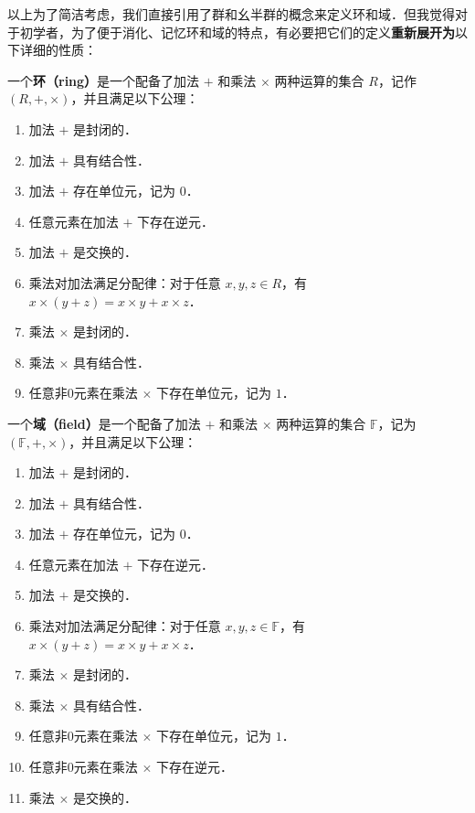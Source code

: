 以上为了简洁考虑，我们直接引用了群和幺半群的概念来定义环和域．但我觉得对于初学者，为了便于消化、记忆环和域的特点，有必要把它们的定义\textbf{重新展开为}以下详细的性质：

\begin{definition}{}
一个\textbf{环（ring）}是一个配备了加法 $+$ 和乘法 $\times$ 两种运算的集合 $R$，记作 $(R, +, \times)$，并且满足以下公理：
\begin{enumerate}
    \item 加法 $+$ 是封闭的．
    \item 加法 $+$ 具有结合性．
    \item 加法 $+$ 存在单位元，记为 $0$．
    \item 任意元素在加法 $+$ 下存在逆元．
    \item 加法 $+$ 是交换的．
    \item 乘法对加法满足分配律：对于任意 $x, y, z\in R$，有 $x\times(y+z)=x\times y+x\times z$．
    \item 乘法 $\times$ 是封闭的．
    \item 乘法 $\times$ 具有结合性．
    \item 任意非$0$元素在乘法 $\times$ 下存在单位元，记为 $1$．
\end{enumerate}
\end{definition}

\begin{definition}{}
一个\textbf{域（field）}是一个配备了加法 $+$ 和乘法 $\times$ 两种运算的集合 $\mathbb{F}$，记为 $(\mathbb{F}, +, \times)$，并且满足以下公理：

\begin{enumerate}
    \item 加法 $+$ 是封闭的．
    \item 加法 $+$ 具有结合性．
    \item 加法 $+$ 存在单位元，记为 $0$．
    \item 任意元素在加法 $+$ 下存在逆元．
    \item 加法 $+$ 是交换的．
    \item 乘法对加法满足分配律：对于任意 $x, y, z\in \mathbb{F}$，有 $x\times(y+z)=x\times y+x\times z$．
    \item 乘法 $\times$ 是封闭的．
    \item 乘法 $\times$ 具有结合性．
    \item 任意非$0$元素在乘法 $\times$ 下存在单位元，记为 $1$．
    \item 任意非$0$元素在乘法 $\times$ 下存在逆元．
    \item 乘法 $\times$ 是交换的．
\end{enumerate}
\end{definition}

